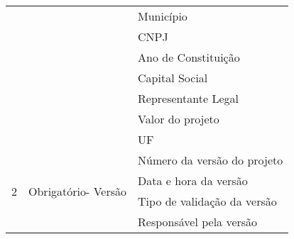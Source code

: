 \begin{table}[!h]
\begin{tabular}{|c|c|l|}
                          &   & Município                                           \\ \cline{3-3}
			  &   & CNPJ                                                \\ \cline{3-3}
                          &   & Ano de Constituição                                 \\ \cline{3-3}
                          &   & Capital Social                                      \\ \cline{3-3}
                          &   & Representante Legal                                 \\ \cline{3-3}
                          &   & Valor do projeto                                    \\ \cline{3-3}

                          &   & UF                                                  \\ \hline   
      \multirow{4}{*}{2}        & \multirow{4}{*}{Obrigatório- Versão} & Número da versão do projeto \\ \cline{3-3} 
				  &                              & Data e hora da versão       \\ \cline{3-3} 
				  &                              & Tipo de validação da versão \\ \cline{3-3} 
				  &                              & Responsável pela versão     \\ \hline
      \end{tabular}
      \end{table}
      
